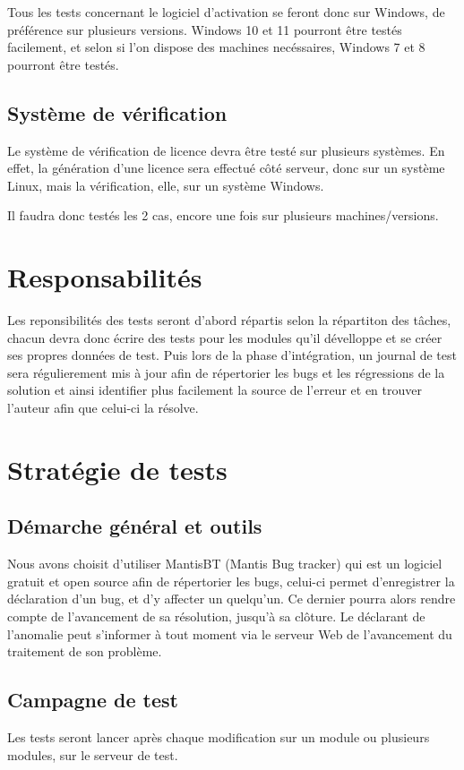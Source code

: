 Tous les tests concernant le logiciel d'activation se
feront donc sur Windows, de préférence sur plusieurs versions. Windows 10 et 11 pourront être
testés facilement, et selon si l'on dispose des machines necéssaires, Windows 7 et 8 pourront être
testés.

\section{Système de vérification}
Le système de vérification de licence devra être testé sur plusieurs systèmes. En effet, la
génération d'une licence sera effectué côté serveur, donc sur un système Linux, mais la
vérification, elle, sur un système Windows.

Il faudra donc testés les 2 cas, encore une fois sur plusieurs machines/versions.

 
\chapter{Responsabilités}
Les reponsibilités des tests seront d'abord répartis selon la répartiton des tâches, chacun
devra donc écrire des tests pour les modules qu'il dévelloppe et se créer ses propres données
de test. Puis lors de la phase d'intégration, un journal de test sera régulierement mis à jour
afin de répertorier les bugs et les régressions de la solution et ainsi identifier plus      
facilement la source de l'erreur et en trouver l'auteur afin que celui-ci la résolve.


\chapter{Stratégie de tests}

\section{Démarche général et outils} 
Nous avons choisit d'utiliser MantisBT (Mantis Bug tracker) qui est un logiciel gratuit
et open source afin de répertorier les bugs, celui-ci permet d'enregistrer la déclaration
 d'un bug, et d'y affecter un quelqu'un. Ce dernier pourra alors rendre compte de
l'avancement de sa résolution, jusqu'à sa clôture. Le déclarant de l'anomalie peut  
s'informer à tout moment via le serveur Web de l'avancement du traitement de 
son problème.  

\section{Campagne de test}
Les tests seront lancer après chaque modification sur un module ou plusieurs modules, sur
le serveur de test.

